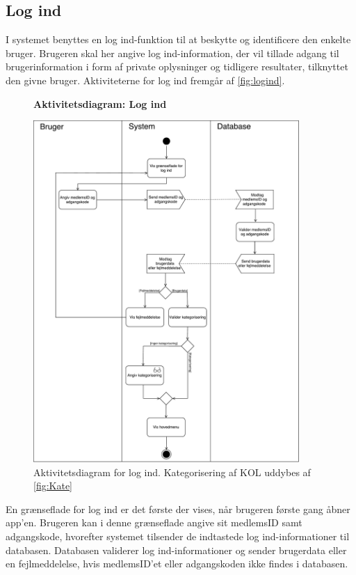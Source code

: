 \subsection*{Log ind}
I systemet benyttes en log ind-funktion til at beskytte og identificere den enkelte bruger. Brugeren skal her angive log ind-information, der vil tillade adgang til brugerinformation i form af private oplysninger og tidligere resultater, tilknyttet den givne bruger. Aktiviteterne for log ind fremgår af \autoref{fig:logind}.    


\begin{figure} [H]
\centering
\textbf{Aktivitetsdiagram: Log ind}\par\medskip
\includegraphics[width=0.9\textwidth]{figures/aktivitetsdiagram/Logind}
\caption{Aktivitetsdiagram for log ind. Kategorisering af KOL uddybes af \autoref{fig:Kate}}
\label{fig:logind}
\end{figure}

\noindent
En grænseflade for log ind er det første der vises, når brugeren første gang åbner app'en. Brugeren kan i denne grænseflade angive sit medlemsID samt adgangskode, hvorefter systemet tilsender de indtastede log ind-informationer til databasen. Databasen validerer log ind-informationer og sender brugerdata eller en fejlmeddelelse, hvis medlemsID'et eller adgangskoden ikke findes i databasen. 


